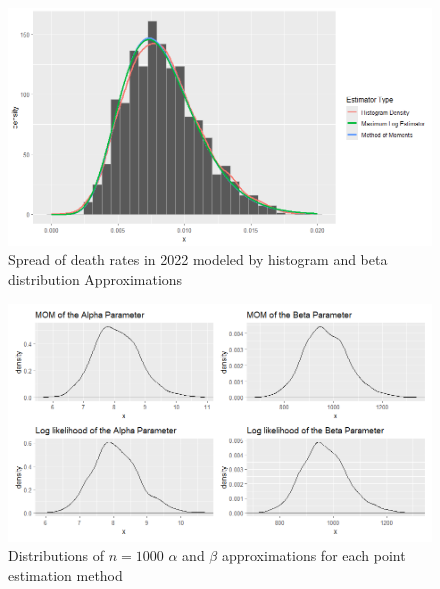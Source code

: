 \documentclass{article}\usepackage[]{graphicx}\usepackage[]{xcolor}
\begin{document}
\begin{figure}[h]
  \begin{center}
  \begin{minipage}{0.50\textwidth}
    \includegraphics[width=\textwidth]{DeathRateBeta.png}
    \caption{Spread of death rates in 2022 modeled by histogram and beta distribution Approximations}
    \label{fig3}
   \end{minipage}
   \end{center}
\end{figure}

\begin{figure}[h]
  \begin{center}
  \begin{minipage}{0.50\textwidth}
    \includegraphics[width=\textwidth]{Parameters1000.png}
    \caption{Distributions of $n = 1000$ $\alpha$ and $\beta$ approximations for each point estimation method}
    \label{fig4}
   \end{minipage}
   \end{center}
\end{figure}
\end{document}
